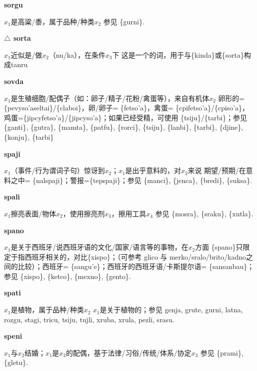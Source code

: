 \documentclass[notitlepage,twocolumn,a4paper,10pt]{book}
\begin{document}
{\sffamily\bfseries sorgu}\enspace {\ttfamily\bfseries[sog]}  $x_1$是高粱\slash{}黍，属于品种\slash{}种类$x_2$ \textemdash{} 参见 \{gurni\}.

{\sffamily\bfseries $\triangle$ sorta} $x_1$近似是\slash{}做$x_2$（nu\slash{}ka），在条件$x_3$下 \textemdash{} 这是一个的词，用于与\{kinda\}或\{sorta\}构成tanru

{\sffamily\bfseries sovda}\enspace {\ttfamily\bfseries[sov     so'a]}  $x_1$是生殖细胞\slash{}配偶子（如：卵子\slash{}精子\slash{}花粉\slash{}禽蛋等），来自有机体$x_2$ \textemdash{} 卵形的= \{pevyso'aseltai\}\slash{}\{claboi\}，卵\slash{}卵子= \{fetso'a\}，禽蛋= \{cpifetso'a\}\slash{}\{cpiso'a\}，鸡蛋=\{jipcyfetso'a\}\slash{}\{jipcyso'a\}；如果已经受精，可使用 \{tsiju\}\slash{}\{tarbi\}；参见 \{ganti\}, \{gutra\}, \{mamta\}, \{patfu\}, \{rorci\}, \{tsiju\}, \{lanbi\}, \{tarbi\}, \{djine\}, \{konju\}, \{tarbi\}

{\sffamily\bfseries spaji}\enspace {\ttfamily\bfseries[paj]}  $x_1$（事件\slash{}行为谓词子句）惊讶到$x_2$；$x_1$是出乎意料的，对$x_2$来说 \textemdash{} 期望\slash{}预期\slash{}在意料之中= \{nalspaji\}；警报=\{tepspaji\}；参见 \{manci\}, \{jenca\}, \{bredi\}, \{suksa\}.

{\sffamily\bfseries spali} $x_1$擦亮表面\slash{}物体$x_2$，使用擦亮剂$x_3$，擦用工具$x_4$ \textemdash{} 参见 \{mosra\}, \{sraku\}, \{xutla\}.

{\sffamily\bfseries spano}\enspace {\ttfamily\bfseries[san]}  $x_1$是关于西班牙\slash{}说西班牙语的文化\slash{}国家\slash{}语言等的事物，在$x_2$方面 \textemdash{} \{spano\}只限定于指西班牙相关的，对比\{xispo\}；（可参考 glico 与 merko\slash{}sralo\slash{}brito\slash{}kadno之间的比较）；西班牙= \{sangu'e\}；西班牙的西班牙语\slash{}卡斯提尔语= \{sansanbau\}；参见 \{xispo\}, \{ketco\}, \{mexno\}, \{gento\}.

{\sffamily\bfseries spati}\enspace {\ttfamily\bfseries[    spa]}  $x_1$是植物，属于品种\slash{}种类$x_2$ \textemdash{} $x_1$是关于植物的；参见 {genja}, {grute}, {gurni}, {latna}, {rozgu}, {stagi}, {tricu}, {tsiju}, {tujli}, {xruba}, {xrula}, {pezli}, {srasu}.

{\sffamily\bfseries speni}\enspace {\ttfamily\bfseries[    spe]}  $x_1$与$x_2$结婚；$x_1$是$x_2$的配偶，基于法律\slash{}习俗\slash{}传统\slash{}体系\slash{}协定$x_3$ \textemdash{} 参见 \{prami\}, \{gletu\}.
\end{document}
